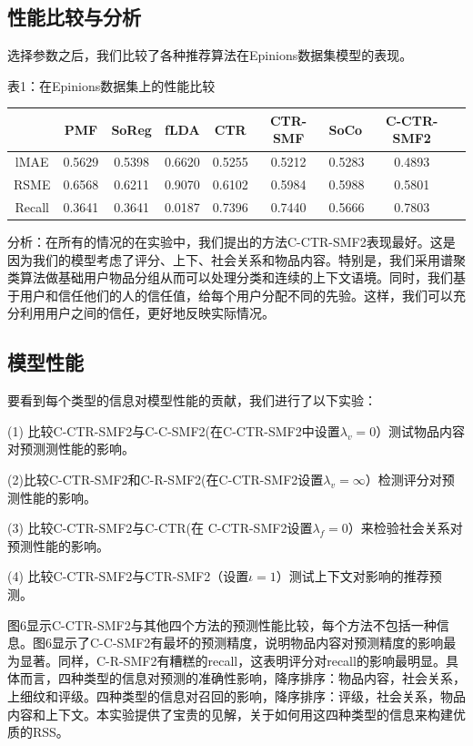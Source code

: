 \documentclass[10pt,a4paper]{article}
\theoremstyle{mythm}%
\numberwithin{equation}{section}
\begin{document}
\subsection{性能比较与分析}
选择参数之后，我们比较了各种推荐算法在Epinions数据集模型的表现。

表1：在Epinions数据集上的性能比较

\begin{table}[!hbp]
\begin{tabular}{|c|c|c|c|c|clcl}
\hline
\hline
   & PMF & SoReg & fLDA & CTR & CTR-SMF & SoCo & C-CTR-SMF2  
\\
\hline
lMAE & 0.5629 & 0.5398 &  0.6620 & 0.5255 & 0.5212 & 0.5283 & 0.4893 
 \\
\hline
RSME & 0.6568 &  0.6211 & 0.9070 & 0.6102 & 0.5984 &  0.5988 & 0.5801
 \\
\hline
Recall & 0.3641 &  0.3641 & 0.0187 & 0.7396 & 0.7440 & 0.5666 & 0.7803
 \\
\hline
\end{tabular}
\end{table} 


分析：在所有的情况的在实验中，我们提出的方法C-CTR-SMF2表现最好。这是因为我们的模型考虑了评分、上下、社会关系和物品内容。特别是，我们采用谱聚类算法做基础用户物品分组从而可以处理分类和连续的上下文语境。同时，我们基于用户和信任他们的人的信任值，给每个用户分配不同的先验。这样，我们可以充分利用用户之间的信任，更好地反映实际情况。
\subsection{模型性能}
要看到每个类型的信息对模型性能的贡献，我们进行了以下实验：

(1) 比较C-CTR-SMF2与C-C-SMF2(在C-CTR-SMF2中设置$\lambda_v=0$）测试物品内容对预测测性能的影响。

(2)比较C-CTR-SMF2和C-R-SMF2(在C-CTR-SMF2设置$\lambda_v = \infty $）检测评分对预测性能的影响。

(3) 比较C-CTR-SMF2与C-CTR(在 C-CTR-SMF2设置$\lambda_f = 0 $）来检验社会关系对预测性能的影响。

(4) 比较C-CTR-SMF2与CTR-SMF2（设置$\iota= 1 $）测试上下文对影响的推荐预测。


图6显示C-CTR-SMF2与其他四个方法的预测性能比较，每个方法不包括一种信息。图6显示了C-C-SMF2有最坏的预测精度，说明物品内容对预测精度的影响最为显著。同样，C-R-SMF2有糟糕的recall，这表明评分对recall的影响最明显。具体而言，四种类型的信息对预测的准确性影响，降序排序：物品内容，社会关系，上细纹和评级。四种类型的信息对召回的影响，降序排序：评级，社会关系，物品内容和上下文。本实验提供了宝贵的见解，关于如何用这四种类型的信息来构建优质的RSS。
\end{document}
